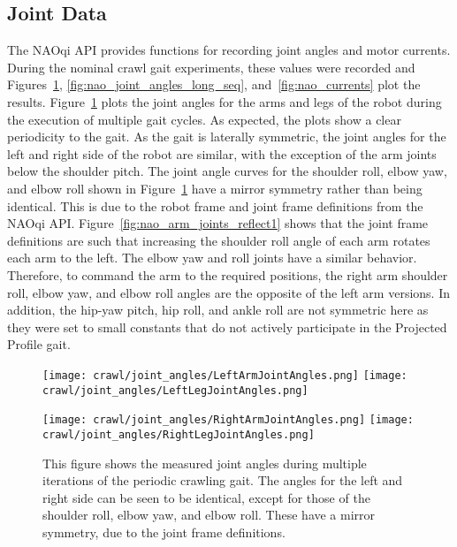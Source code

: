 \subsection{Joint Data} \label{subsec:nom_crawl_joint_data}
The NAOqi API provides functions for recording joint angles and motor currents. During the
nominal crawl gait experiments, these values were recorded and
Figures~\ref{fig:nao_joint_angles1}, \ref{fig:nao_joint_angles_long_seq},
and~\ref{fig:nao_currents} plot the results.
Figure~\ref{fig:nao_joint_angles1} plots the joint angles for the arms and legs of the
robot during the execution of multiple gait cycles. As expected, the plots show a clear
periodicity to the gait.
As the gait is laterally symmetric, the joint angles for the left and right side of the robot
are similar, with the exception of the arm joints below the shoulder pitch.
The joint angle curves for the shoulder roll, elbow yaw, and elbow roll 
shown in Figure~\ref{fig:nao_joint_angles1} have a mirror symmetry rather than being identical.
This is due to the robot frame and joint frame definitions from the NAOqi API\@.
Figure~\ref{fig:nao_arm_joints_reflect1} shows that the joint frame definitions
are such that increasing the shoulder roll angle of each arm rotates each arm to the left.
The elbow yaw and roll joints have a similar behavior. Therefore, to command the arm to
the required positions, the right arm shoulder roll, elbow yaw, and elbow roll angles
are the opposite of the left arm versions.
In addition, the hip-yaw pitch, hip roll, and ankle roll are not symmetric here as they
were set to small constants that do not actively participate in the Projected Profile gait.

\begin{figure}
\centering
\texttt{[image: crawl/joint\_angles/LeftArmJointAngles.png]}
\texttt{[image: crawl/joint\_angles/LeftLegJointAngles.png]}

\centering
\texttt{[image: crawl/joint\_angles/RightArmJointAngles.png]}
\texttt{[image: crawl/joint\_angles/RightLegJointAngles.png]}

\caption{This figure shows the measured joint angles during multiple iterations of the periodic crawling gait.
         The angles for the left and right side can be seen to be identical, except for those
         of the shoulder roll, elbow yaw, and elbow roll. These have a mirror symmetry, due to
         the joint frame definitions.}
\label{fig:nao_joint_angles1}
\end{figure}

